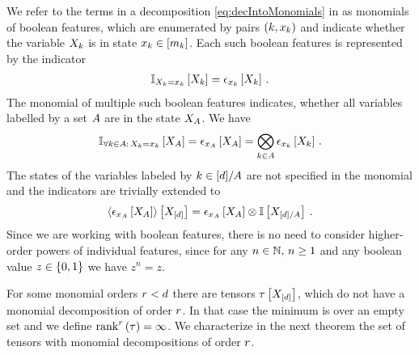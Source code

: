We refer to the terms in a decomposition \eqref{eq:decIntoMonomials} in  as monomials of boolean features, which are enumerated by pairs $(k,x_{k})$ and indicate whether the variable $X_{k}$ is in state $x_{k}\in[m_{k}]$.
Each such boolean features is represented by the indicator
\begin{align*}
    \mathbb{I}_{X_{k}=x_{k}}\left[X_{k}\right] =
    \epsilon_{x_{k}}\left[X_{k}\right] \, .
\end{align*}
The monomial of multiple such boolean features indicates, whether all variables labelled by a set $A$ are in the state $X_{A}$.
We have
\begin{align*}
    \mathbb{I}_{\forall{k\in A}: \, X_{k}=x_{k}}\left[X_{A}\right]
    = \epsilon_{x_{A}}\left[X_{A}\right] = \bigotimes_{k\in A} \epsilon_{x_{k}}\left[X_{k}\right]  \, .
\end{align*}
The states of the variables labeled by $k\in[d]/A$ are not specified in the monomial and the indicators are trivially extended to
\begin{align*}
    \left\langle \epsilon_{x_{A}}\left[X_{A}\right]\right\rangle \left[ X_{[d]} \right]
    = \epsilon_{x_{A}}\left[X_{A}\right] \otimes \mathbb{I}\left[X_{[d]/A}\right] \, .
\end{align*}
Since we are working with boolean features, there is no need to consider higher-order powers of individual features, since for any $n\in\mathbb{N}, \, n\geq1$ and any boolean value $z\in\{0,1\}$ we have $z^n=z$.

For some monomial orders $r<d$ there are tensors $\tau\left[X_{[d]}\right]$, which do not have a monomial decomposition of order $r$.
In that case the minimum is over an empty set and we define $\mathrm{rank}^{r}\left(\tau\right)=\infty$.
We characterize in the next theorem the set of tensors with monomial decompositions of order $r$.

